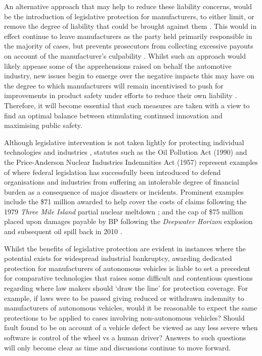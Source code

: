 \documentclass[conference]{IEEEtran}
\begin{document}
An alternative approach that may help to reduce these liability concerns, would be the introduction of legislative protection for manufacturers, to either limit, or remove the degree of liability that could be brought against them \cite{marchant}. This would in effect continue to leave manufacturers as the party held primarily responsible in the majority of cases, but prevents prosecutors from collecting excessive  payouts on account of the manufacturer's culpability \cite{marchant}. Whilst such an approach would likely appease some of the apprehensions raised on behalf the automotive industry, new issues begin to emerge over the negative impacts this may have on the degree to which manufacturers will remain incentivised to push for improvements in product safety under efforts to reduce their own liability \cite{marchant}. Therefore, it will become essential that such measures are taken with a view to find an optimal balance between stimulating continued innovation and maximising public safety. 
	
	Although legislative intervention is not taken lightly for protecting individual technologies and industries \cite{marchant}, statutes such as the Oil Pollution Act (1990) \cite{oil-pollution-act} and the Price-Anderson Nuclear Industries Indemnities Act (1957) \cite{nuclear-act} represent examples of where federal legislation has successfully been introduced to defend organisations and industries from suffering an intolerable degree of financial burden as a consequence of major disasters or incidents. Prominent examples include the \$71 million awarded to help cover the costs of claims following the 1979 \textit{Three Mile Island} partial nuclear meltdown \cite{three-mile-island}; and the cap of \$75 million placed upon damages payable by BP following the \textit{Deepwater Horizon} explosion and subsequent oil spill back in 2010 \cite{deepwater}.
	
	Whilst the benefits of legislative protection are evident in instances where the potential exists for widespread industrial bankruptcy, awarding dedicated  protection for manufacturers of autonomous vehicles is liable to set a precedent for comparative technologies that raises some difficult and contentious questions regarding where law makers should `draw the line' for protection coverage. For example, if laws were to be passed giving reduced or withdrawn indemnity to manufacturers of autonomous vehicles, would it be reasonable to expect the same protections to be applied to cases involving non-autonomous vehicles? Should fault found to be on account of a vehicle defect be viewed as any less severe when software is control of the wheel vs a human driver? Answers to such questions will only become clear as time and discussions continue to move forward.
\end{document}
